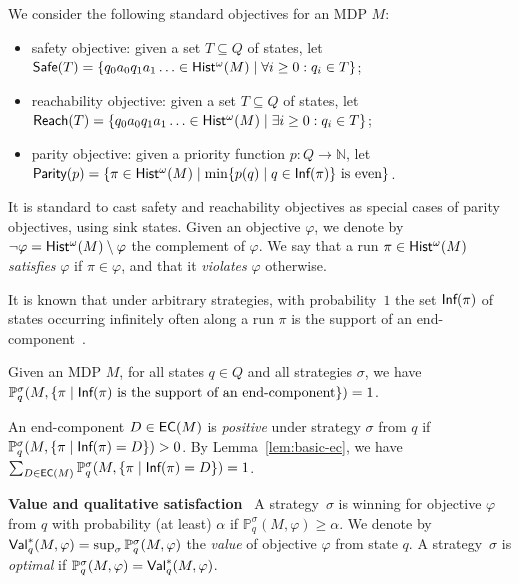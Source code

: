 \documentclass[a4paper,USenglish,cleveref, autoref, thm-restate]{lipics-v2021}
\def\myparagraph#1{\noindent\textbf{#1}~}
\newcommand{\nat}{\mathbb N}
\newcommand*{\pr}{\mathbb{P}}
\newcommand\Safe{\textrm{\sf Safe}}
\newcommand\Reach{\textrm{\sf Reach}}
\newcommand\Parity{\textrm{\sf Parity}}
\newcommand\R{{\sf Hist^{\omega}}}
\newcommand\ecs{\textrm{\sf EC}}
\newcommand\Inf{\textrm{\sf Inf}}
\newcommand\Val{\ensuremath{{\textrm{\sf Val}}}}
\begin{document}
We consider the following standard objectives for an MDP $M$:
\begin{itemize}
\item safety objective: given a set $T \subseteq Q$ of states, let $\Safe(T)= \{
q_0 a_0 q_1 a_1 \ldots \in \R(M) \mid \forall i\geq 0: q_i \in T \}$;

\item reachability objective: given a set $T \subseteq Q$ of states, let $\Reach(T)= \{
q_0 a_0 q_1 a_1 \ldots \in \R(M) \mid \exists i\geq 0: q_i \in T \}$;

\item parity objective: given a priority function $p: Q \to \nat$,
let $\Parity(p)= \{\pi \in \R(M) \mid \min\{ p(q) \mid q \in \Inf(\pi) \} \text{ is even}\}$.



\end{itemize}
It is standard to cast safety and reachability objectives as special 
cases of parity objectives, using sink states.
Given an objective $\varphi$, we denote by $\lnot \varphi = \R(M) \setminus \varphi$ 
the complement of $\varphi$. We say that a run $\pi \in \R(M)$ \emph{satisfies}
$\varphi$ if $\pi \in \varphi$, and that it \emph{violates} $\varphi$ otherwise.

It is known that under arbitrary strategies,  with probability~$1$ the set $\Inf(\pi)$ of states occurring 
infinitely often along a run $\pi$ is the support of an end-component~\cite{CY-acm95,DeAlfaro-phd97}. 


\begin{lemma}\label{lem:basic-ec}
	Given an MDP $M$, for all states $q \in Q$ and all strategies $\sigma$,
	we have $\pr_{q}^{\sigma}(M, \{\pi \mid \Inf(\pi) \text{ is the support of an end-component}\}) = 1$.
\end{lemma}

An end-component $D \in \ecs(M)$ is \emph{positive} under strategy $\sigma$ 
from $q$ if $\pr_{q}^{\sigma}(M, \{\pi \mid\Inf(\pi)  = D\}) > 0$.
By Lemma~\ref{lem:basic-ec}, we have $\sum_{D \in \ecs(M)} \pr_{q}^{\sigma}(M, \{\pi \mid\Inf(\pi)  = D\}) = 1$.
	
	


\smallskip
\myparagraph{Value and qualitative satisfaction}
A strategy~$\sigma$ is winning for objective $\varphi$ from $q$ with probability
(at least) $\alpha$ if  $\pr_{q}^{\sigma}(M, \varphi) \geq \alpha$.
We denote by $\Val_{q}^*(M,\varphi) = \sup_{\sigma} \pr_{q}^{\sigma}(M, \varphi)$
the \emph{value} of objective $\varphi$ from state $q$.
A strategy~$\sigma$ is \emph{optimal} if $\pr_{q}^{\sigma}(M, \varphi) = \Val_{q}^*(M,\varphi)$.
\end{document}
